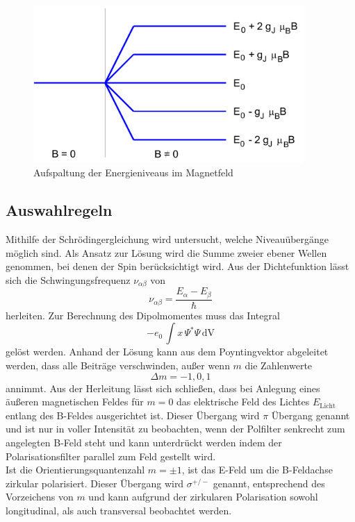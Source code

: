 \begin{figure}
  \centering
  \includegraphics[height=6cm]{./Bilder/ENiveaus.png}
  \caption{Aufspaltung der Energieniveaus im Magnetfeld \cite{V27}}
   \label{fig:Eniv}
\end{figure}

\subsection{Auswahlregeln}
Mithilfe der Schrödingergleichung wird untersucht, welche Niveauübergänge möglich sind. Als Ansatz zur Lösung wird die Summe zweier ebener Wellen genommen, bei denen der Spin berücksichtigt wird. Aus der Dichtefunktion lässt sich die Schwingungsfrequenz $\nu_{\alpha\beta}$ von
\begin{equation}
  \nu_{\alpha\beta}= \frac{E_{\alpha} - E_{\beta}}{\hbar}
  \label{eqn:nu}
\end{equation}
herleiten. Zur Berechnung des Dipolmomentes muss das Integral
\begin{equation}
  -e_0\, \int x \, \Psi^* \Psi \, \text{dV}
\end{equation}
gelöst werden. Anhand der Lösung kann aus dem Poyntingvektor abgeleitet werden, dass alle Beiträge verschwinden, außer wenn $m$ die Zahlenwerte
\begin{equation}
  \Delta m = -1,0,1
\end{equation}
annimmt. Aus der Herleitung lässt sich schließen, dass bei Anlegung eines äußeren magnetischen Feldes für $m = 0$ das elektrische Feld des Lichtes $E_\text{Licht}$ entlang des B-Feldes ausgerichtet ist. Dieser Übergang wird $\pi$ Übergang genannt und ist nur in voller Intensität zu beobachten, wenn der Polfilter senkrecht zum angelegten B-Feld steht und kann unterdrückt werden indem der Polarisationsfilter parallel zum Feld gestellt wird. \\
Ist die Orientierungsquantenzahl $m = \pm 1$, ist das E-Feld um die B-Feldachse zirkular polarisiert. Dieser Übergang wird $\sigma^{+/-}$ genannt, entsprechend des Vorzeichens von $m$ und kann aufgrund der zirkularen Polarisation sowohl longitudinal, als auch transversal beobachtet werden. 

